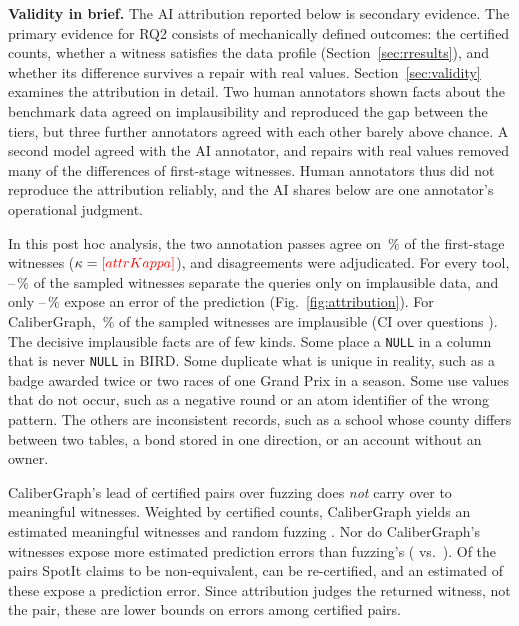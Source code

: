 \textbf{Validity in brief.} The AI attribution reported below is secondary evidence. The primary evidence for RQ2 consists of mechanically defined outcomes: the certified counts, whether a witness satisfies the data profile (Section~\ref{sec:rresults}), and whether its difference survives a repair with real values. Section~\ref{sec:validity} examines the attribution in detail. Two human annotators shown facts about the benchmark data agreed on implausibility and reproduced the gap between the tiers, but three further annotators agreed with each other barely above chance. A second model agreed with the AI annotator, and repairs with real values removed many of the differences of first-stage witnesses. Human annotators thus did not reproduce the attribution reliably, and the AI shares below are one annotator's operational judgment.

In this post hoc analysis, the two annotation passes agree on \,\% of the  first-stage witnesses ($\kappa=\V{attrKappa}$), and  disagreements were adjudicated. For every tool, --\,\% of the sampled witnesses separate the queries only on implausible data, and only --\,\% expose an error of the prediction (Fig.~\ref{fig:attribution}). For CaliberGraph, \,\% of the sampled witnesses are implausible (CI over questions ). The decisive implausible facts are of few kinds. Some place a \texttt{NULL} in a column that is never \texttt{NULL} in BIRD. Some duplicate what is unique in reality, such as a badge awarded twice or two races of one Grand Prix in a season. Some use values that do not occur, such as a negative round or an atom identifier of the wrong pattern. The others are inconsistent records, such as a school whose county differs between two tables, a bond stored in one direction, or an account without an owner.

CaliberGraph's lead of  certified pairs over fuzzing does \emph{not} carry over to meaningful witnesses. Weighted by certified counts, CaliberGraph yields an estimated  meaningful witnesses  and random fuzzing  . Nor do CaliberGraph's witnesses expose more estimated prediction errors than fuzzing's ( vs.\ ). Of the  pairs SpotIt claims to be non-equivalent,  can be re-certified, and an estimated  of these expose a prediction error. Since attribution judges the returned witness, not the pair, these are lower bounds on errors among certified pairs.



